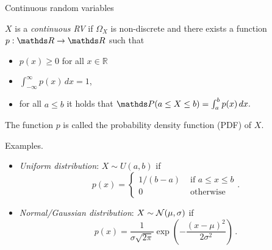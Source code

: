 \begin{vbframe}{Continuous random variables} 
	
	$X$ is a \emph{continuous RV} if $\Omega_X$ is non-discrete and there exists a function $p: \R \to \R$ such that 
%	
	\begin{itemize}
%		
		\item 
		$p(x) \geq 0$ for all $x \in \mathbb{R}$
%		
		\item $\int_{-\infty}^\infty p(x) \, dx = 1$,
%		
		\item for all $a \leq b$ it holds that	$
		\P(a \leq X \leq b) = \int_a^b p(x) \, dx .
		$
%
	\end{itemize} 
% 
	The function $p$ is called the probability density function (PDF) of $X$.
	
	\lz
	
	Examples.
	
	\begin{itemize}
			\item \emph{Uniform distribution}: $X \sim U(a,b)$ if 
		$$
		p(x) = \left\{ \begin{array}{cl}
			1/(b-a) & \text{ if } a \leq x \leq b  \\
			0 & \text{ otherwise}
		\end{array} \right. .
		$$
		\item \emph{Normal/Gaussian distribution}: $X \sim \mathcal{N}(\mu, \sigma)$ if
		$$
		p(x) = \frac{1}{\sigma \sqrt{2\pi}} \exp \left( -\frac{(x- \mu)^2 }{2 \sigma^2} \right)\, .
		$$ 
	\end{itemize}
\end{vbframe}

